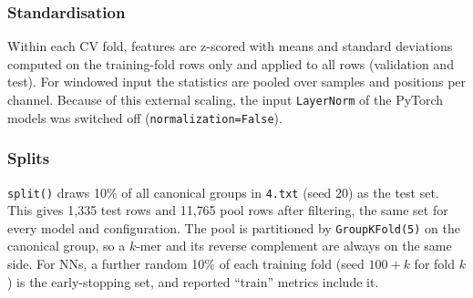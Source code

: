 \subsubsection{Standardisation}
Within each CV fold, features are z-scored with means and standard deviations computed on the training-fold rows only and applied to all rows (validation and test). For windowed input the statistics are pooled over samples and positions per channel. Because of this external scaling, the input \texttt{LayerNorm} of the PyTorch models was switched off (\texttt{normalization=False}).

\subsubsection{Splits}
\texttt{split()} draws 10\% of all canonical groups in \texttt{4.txt} (seed 20) as the test set. This gives 1{,}335 test rows and 11{,}765 pool rows after filtering, the same set for every model and configuration. The pool is partitioned by \texttt{GroupKFold(5)} on the canonical group, so a $k$-mer and its reverse complement are always on the same side. For NNs, a further random 10\% of each training fold (seed $100+k$ for fold $k$) is the early-stopping set, and reported ``train'' metrics include it.

